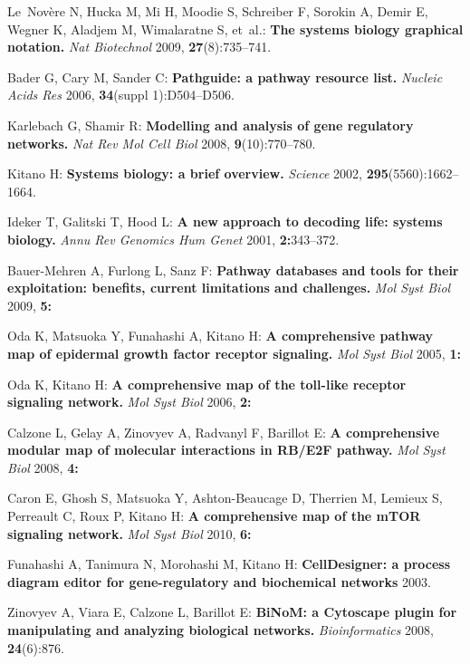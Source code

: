\documentclass[11pt]{bmc_article_s50}
\begin{document}
\begin{thebibliography}{10}
Le~Nov{\`e}re N, Hucka M, Mi H, Moodie S, Schreiber F, Sorokin A, Demir E,
  Wegner K, Aladjem M, Wimalaratne S, et~al.: \textbf{The systems biology
  graphical notation.} \emph{Nat Biotechnol} 2009,
  \textbf{27}(8):735--741.

Bader G, Cary M, Sander C: \textbf{Pathguide: a pathway resource list.}
  \emph{Nucleic Acids Res} 2006, \textbf{34}(suppl 1):D504--D506.

Karlebach G, Shamir R: \textbf{Modelling and analysis of gene regulatory
  networks.} \emph{Nat Rev Mol Cell Biol} 2008,
  \textbf{9}(10):770--780.

Kitano H: \textbf{Systems biology: a brief overview.} \emph{Science} 2002,
  \textbf{295}(5560):1662--1664.

Ideker T, Galitski T, Hood L: \textbf{A new approach to decoding life: systems
  biology.} \emph{Annu Rev Genomics Hum Genet} 2001,
  \textbf{2:}343--372.

Bauer-Mehren A, Furlong L, Sanz F: \textbf{Pathway databases and tools for
  their exploitation: benefits, current limitations and challenges.}
  \emph{Mol Syst Biol} 2009, \textbf{5:}

Oda K, Matsuoka Y, Funahashi A, Kitano H: \textbf{A comprehensive pathway map
  of epidermal growth factor receptor signaling.} \emph{Mol Syst Biol} 2005, \textbf{1:}

Oda K, Kitano H: \textbf{A comprehensive map of the toll-like receptor
  signaling network.} \emph{Mol Syst Biol} 2006, \textbf{2:}

Calzone L, Gelay A, Zinovyev A, Radvanyl F, Barillot E: \textbf{A comprehensive
  modular map of molecular interactions in RB/E2F pathway.} \emph{Mol Syst Biol} 2008, \textbf{4:}

Caron E, Ghosh S, Matsuoka Y, Ashton-Beaucage D, Therrien M, Lemieux S,
  Perreault C, Roux P, Kitano H: \textbf{A comprehensive map of the mTOR
  signaling network.} \emph{Mol Syst Biol} 2010, \textbf{6:}

Funahashi A, Tanimura N, Morohashi M, Kitano H: \textbf{CellDesigner: a process
  diagram editor for gene-regulatory and biochemical networks} 2003.

Zinovyev A, Viara E, Calzone L, Barillot E: \textbf{BiNoM: a Cytoscape plugin
  for manipulating and analyzing biological networks.} \emph{Bioinformatics}
  2008, \textbf{24}(6):876.


\end{thebibliography}
\end{document}
